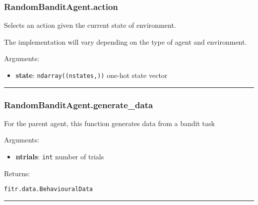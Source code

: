 \subsubsection{RandomBanditAgent.action}\label{randombanditagent.action}

\begin{Shaded}
\begin{Highlighting}[]
\end{Highlighting}
\end{Shaded}

Selects an action given the current state of environment.

The implementation will vary depending on the type of agent and
environment.

Arguments:

\begin{itemize}
\tightlist
\item
  \textbf{state}: \texttt{ndarray((nstates,))} one-hot state vector
\end{itemize}

\begin{center}\rule{0.5\linewidth}{\linethickness}\end{center}

\subsubsection{RandomBanditAgent.generate\_data}\label{randombanditagent.generate_data}

\begin{Shaded}
\begin{Highlighting}[]
\end{Highlighting}
\end{Shaded}

For the parent agent, this function generates data from a bandit task

Arguments:

\begin{itemize}
\tightlist
\item
  \textbf{ntrials}: \texttt{int} number of trials
\end{itemize}

Returns:

\texttt{fitr.data.BehaviouralData}

\begin{center}\rule{0.5\linewidth}{\linethickness}\end{center}


